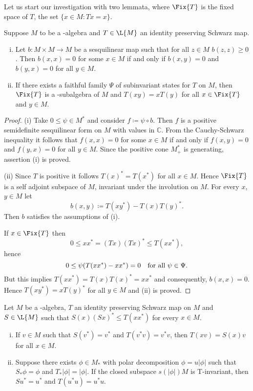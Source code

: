 Let us start our investigation with two lemmata, where $ \Fix{T} $ is the fixed space of $T$, \ie the set $ \{x\in M \colon Tx=x \}$.
\begin{lemma}\label{lem:d3-1.1}
Suppose $M$ to be a \CA-algebra and $ T \in \L{M} $ an identity preserving Schwarz map.

\begin{enumerate}[(i)]
\item 
Let $ b \colon M \times M \to M $ be a sesquilinear map such that for all $ z \in M $ $ b(z,z) \geq 0 $.
Then $ b(x,x) = 0 $ for some $x\in M$ if and only if $b(x,y) = 0$ and $b(y,x) = 0$ for all $y\in M$.

\item 
If there exists a faithful family $\Psi$ of subinvariant states for $T$ on $M$, then $\Fix{T}$ is a \CA-subalgebra of $M$ and $T(xy) = xT(y)$ for all $ x \in \Fix{T} $ and $ y \in M $.

\end{enumerate}
\end{lemma}
\begin{proof} 
(i) Take $0 \leq \psi \in M^{*}$ and consider $f \coloneqq \psi\circ b$.
Then $f$ is a positive semidefinite sesquilinear form on $M$ with values in $\mathbb{C}$.
From the Cauchy-Schwarz inequality it follows that $f(x,x) = 0$ for some $x\in M$ if and only if $f(x,y) = 0$ and $f(y,x) = 0$ for all $y\in M$.
Since the positive cone $M^{*}_{+}$ is generating, assertion (i) is proved.

(ii) Since $T$ is positive it follows $T(x)^{*} = T(x^{*})$ for all $x\in M$.
Hence $\Fix{T}$ is a self adjoint subspace of $M$, \ie invariant under the involution on $M$.
For every $x$, $ y \in M $ let
\[
	b(x,y) \coloneqq T(xy^{*}) - T(x)T(y)^{*}.
\]
Then $b$ satisfies the assumptions of (i).

If $x\in\Fix{T}$ then
\[
0 \leq xx^{*} = (Tx)(Tx)^{*} \leq T(xx^{*}),
\]
hence
\[
0 \leq \psi(T(xx^{*}) - xx^{*}) = 0 \quad \text{for all $ \psi\in\Psi $.} 
\]
But this implies $T(xx^{*}) = T(x)T(x)^{*} = xx^{*}$ and consequently, $b(x,x) = 0$.
Hence $T(xy^{*}) = xT(y)^{*}$ for all $y\in M$ and (ii) is proved.
\end{proof}
\begin{lemma}\label{lem:d3-1.2}
Let $M$ be a \WA-algebra, $T$ an identity preserving Schwarz map on $M$ and $S\in\L{M}$ such that $S(x)(Sx)^{*} \leq T(xx^{*})$ for every $x\in M$.

\begin{enumerate}[(i)]
\item 
If $v\in M$ such that $S(v^{*}) = v^{*}$ and $T(v^{*}v) = v^{*}v$, then $T(xv) = S(x)v$ for all $x\in M$.

\item 
Suppose there exists $\phi\in M_{*}$ with polar decomposition $\phi = u|\phi|$ such that $S_{*}\phi = \phi$ and $T_{*}|\phi| = |\phi|$.
If the closed subspace $s(|\phi|)M$ is T-invariant, then $Su^{*} = u^{*}$ and $T(u^{*}u) = u^{*}u$.
\end{enumerate}

\end{lemma}
